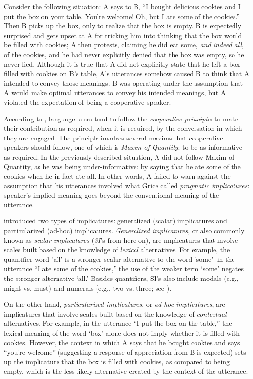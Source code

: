 \documentclass[10pt,letterpaper]{article}
\begin{document}
Consider the following situation: A says to B, ``I bought delicious cookies and I put the box on your table. You're welcome! Oh, but I ate some of the cookies.'' Then B picks up the box, only to realize that the box is empty. B is expectedly surprised and gets upset at A for tricking him into thinking that the box would be filled with cookies; A then protests, claiming he did eat some, \emph{and indeed all}, of the cookies, and he had never explicitly denied that the box was empty, so he never lied. Although it is true that A did not explicitly state that he left a box filled with cookies on B's table, A's utterances somehow caused B to think that A intended to convey those meanings. B was operating under the assumption that A would make optimal utterances to convey his intended meanings, but A violated the expectation of being a cooperative speaker.

According to , language users tend to follow the \emph{cooperative principle}: to make their contribution as required, when it is required, by the conversation in which they are engaged. The principle involves several maxims that cooperative speakers should follow, one of which is \emph{Maxim of Quantity}: to be as informative as required. In the previously described situation, A did not follow Maxim of Quantity, as he was being under-informative: by saying that he ate some of the cookies when he in fact ate all. In other words, A failed to warn against the assumption that his utterances involved what Grice called \emph{pragmatic implicatures}: speaker's implied meaning goes beyond the conventional meaning of the utterance.

 introduced two types of implicatures: generalized (scalar) implicatures and particularized (ad-hoc) implicatures. \emph{Generalized implicatures}, or also commonly known as \emph{scalar implicatures} (\emph{SI}'s from here on), are implicatures that involve scales built based on the knowledge of \emph{lexical} alternatives. For example, the quantifier word `all' is a stronger scalar alternative to the word `some'; in the utterance ``I ate some of the cookies,'' the use of the weaker term `some' negates the stronger alternative `all.' Besides quantifiers, SI's also include modals (e.g., might vs. must) and numerals (e.g., two vs. three; see ).

On the other hand, \emph{particularized implicatures}, or \emph{ad-hoc implicatures}, are implicatures that involve scales built based on the knowledge of \emph{contextual} alternatives. For example, in the utterance ``I put the box on the table,'' the lexical meaning of the word `box' alone does not imply whether it is filled with cookies. However, the context in which A says that he bought cookies and says ``you're welcome'' (suggesting a response of appreciation from B is expected) sets up the implicature that the box is filled with cookies, as compared to being empty, which is the less likely alternative created by the context of the utterance. 
\end{document}
